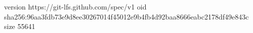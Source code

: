 version https://git-lfs.github.com/spec/v1
oid sha256:96aa3fdb73e9d8ee30267014f45012e9b4fb4d92baa8666eabc2178df49e843c
size 55641
